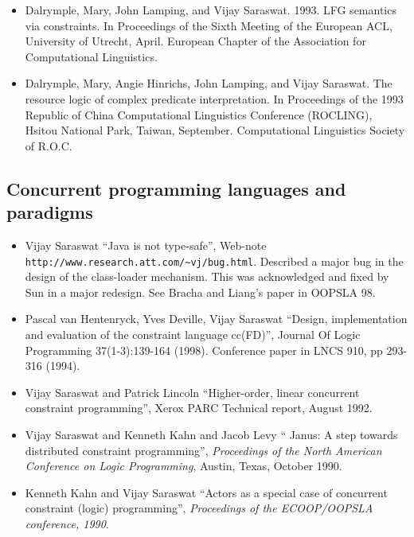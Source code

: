\documentclass{article}
\begin{document}
\begin{itemize}
\item    Dalrymple, Mary, John Lamping, and Vijay Saraswat. 1993.
    LFG semantics via constraints. In Proceedings of the Sixth
    Meeting of the European ACL, University of Utrecht, April.
    European Chapter of the Association for Computational
    Linguistics. 
    
\item    Dalrymple, Mary, Angie Hinrichs, John Lamping, and Vijay Saraswat.
    The resource logic of complex predicate interpretation.
    In Proceedings of the 1993 Republic of China Computational
    Linguistics Conference (ROCLING), Hsitou National Park,
    Taiwan, September. Computational Linguistics Society of R.O.C.
\end{itemize}
\subsection*{Concurrent programming languages and paradigms}
\begin{itemize} 

\item Vijay Saraswat ``Java is not type-safe'', Web-note
  \verb+http://www.research.att.com/~vj/bug.html+. Described a major
  bug in the design of the class-loader mechanism. This was
  acknowledged and fixed by Sun in a major redesign. See Bracha and
  Liang's paper in OOPSLA 98.

\item Pascal van Hentenryck, Yves Deville, Vijay Saraswat ``Design,
    implementation and evaluation of the constraint language cc(FD)'',
    Journal Of Logic Programming 37(1-3):139-164 (1998). Conference
    paper in LNCS 910, pp 293-316 (1994).


\item    Vijay Saraswat and Patrick Lincoln ``Higher-order, linear
    concurrent constraint programming'', Xerox PARC Technical report,
    August 1992.

\item    Vijay Saraswat and Kenneth Kahn and Jacob Levy ``{\sf
    Janus}: A step towards distributed constraint programming'', {\em
    Proceedings of the North American Conference on Logic
    Programming}, Austin, Texas, October 1990.

\item    Kenneth Kahn and Vijay Saraswat ``Actors as a special
    case of concurrent constraint (logic) programming'', {\em
    Proceedings of the ECOOP/OOPSLA conference, 1990}.
  
\end{itemize}
\end{document}
